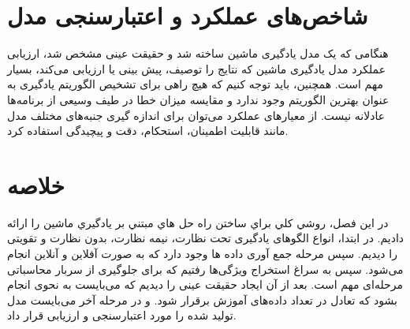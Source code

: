 \section{شاخص‌های عملکرد و اعتبارسنجی مدل}

هنگامی که یک مدل یادگیری ماشین ساخته شد و حقیقت عینی مشخص شد، ارزیابی عملکرد مدل یادگیری ماشین که نتایج را توصیف، پیش بینی یا ارزیابی می‌کند، بسیار مهم است. همچنین، باید توجه کنیم که هیچ راهی برای تشخیص الگوریتم یادگیری به عنوان بهترین الگوریتم وجود ندارد و مقایسه میزان خطا در طیف وسیعی از برنامه‌ها عادلانه نیست. از معیارهای عملکرد می‌توان برای اندازه گیری جنبه‌های مختلف مدل مانند قابلیت اطمینان، استحکام، دقت و پیچیدگی استفاده کرد.


\newpage

\section{خلاصه}


در این فصل، روشي كلي براي ساختن راه حل هاي مبتني بر يادگيري ماشين را ارائه دادیم. در ابتدا، انواع الگوهای یادگیری تحت نظارت، نیمه نظارت، بدون نظارت و تقویتی را دیدیم. سپس مرحله جمع آوری داده ها وجود دارد که به صورت آفلاین و آنلاین انجام می‌شود. سپس به سراغ استخراج ویژگی‌ها رفتیم که برای جلوگیری از سربار محاسباتی مرحله‌ای مهم است. بعد از آن ایجاد حقیقت عینی را دیدیم که می‌بایست به نحوی انجام بشود که تعادل در تعداد داده‌های آموزش برقرار شود. و در مرحله آخر می‌بایست مدل تولید شده را مورد اعتبارسنجی و ارزیابی قرار داد.

